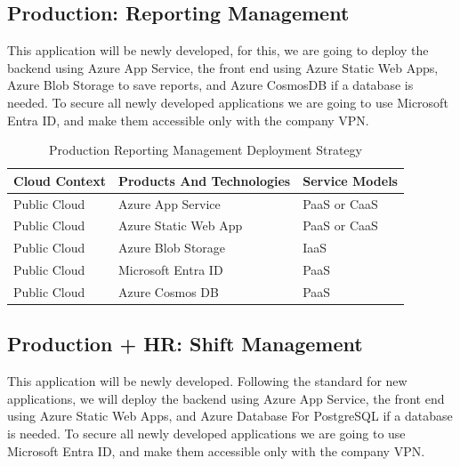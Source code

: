 \documentclass{llncs}
\begin{document}
\subsection{Production: Reporting Management}
This application will be newly developed, for this, we are going to deploy the backend using Azure App Service, the front end using Azure Static Web Apps, Azure Blob Storage to save reports, and Azure CosmosDB if a database is needed.
To secure all newly developed applications we are going to use Microsoft Entra ID, and make them accessible only with the company VPN.\\
\begin{table}[h!]
    \centering
    \begin{tabular}{lll}
        \hline
        \textbf{Cloud Context} & \textbf{Products And Technologies} & \textbf{Service Models} \\
        \hline
        Public Cloud           & Azure App Service                  & PaaS or CaaS            \\
        \hline
        Public Cloud           & Azure Static Web App               & PaaS or CaaS            \\
        \hline
        Public Cloud           & Azure Blob Storage                 & IaaS                    \\
        \hline
        Public Cloud           & Microsoft Entra ID                 & PaaS                    \\
        \hline
        Public Cloud           & Azure Cosmos DB                    & PaaS                    \\
        \hline
    \end{tabular}
    \caption{Production Reporting Management Deployment Strategy}
\end{table}


\subsection{Production + HR: Shift Management}
This application will be newly developed. Following the standard for new applications, we will deploy the backend using Azure App Service, the front end using Azure Static Web Apps, and Azure Database For PostgreSQL if a database is needed.
To secure all newly developed applications we are going to use Microsoft Entra ID, and make them accessible only with the company VPN.\\
\end{document}
